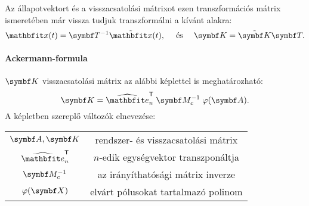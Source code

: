 Az állapotvektort és a visszacsatolási mátrixot ezen transzformációs mátrix
ismeretében már vissza tudjuk transzformálni a kívánt alakra:
\begin{equation}
  \rvec x(t) = \rmat T^{-1} \tvec x(t),
  \quad \text{ és } \quad
  \rmat K = \tmat K \rmat T.
  \label{eq:T-back}
\end{equation}

\paragraph{Ackermann-formula}

$\rmat K$ visszacsatolási mátrix az alábbi képlettel is meghatározható:
\begin{equation}
  \rmat K
  = \uvec e_n^\T
  \;\rmat M_c^{-1}
  \;\varphi(\rmat A)
  .
  \label{eq:Acker-K}
\end{equation}
A képletben szereplő változók elnevezése:
\bgroup
\def\arraystretch{1.2}
\begin{center}
  \begin{tabular}{ | c c | }
    \hline
    $\rmat A, \rmat K$ & rendszer- és visszacsatolási mátrix  \\
    $\uvec e_n^\T$     & $n$-edik egységvektor transzponáltja \\
    $\rmat M_c^{-1}$   & az irányíthatósági mátrix inverze    \\
    $\varphi(\rmat X)$ & elvárt pólusokat tartalmazó polinom  \\
    \hline
  \end{tabular}
\end{center}
\egroup

